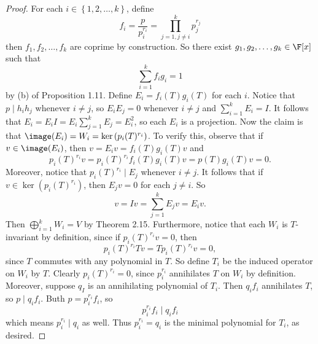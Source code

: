 \documentclass[linearalgebraII]{subfiles}
\begin{document}
    \begin{proof}
        For each $i\in \left\lbrace 1, 2, \ldots, k \right\rbrace$, define
        \begin{equation*}
            f_i = \frac{p}{p_i^{r_i}} = \prod^{k}_{j=1,j\neq i} p_j^{r_j}
        \end{equation*}
        then $f_1, f_2, \ldots, f_k$ are coprime by construction. So there exist $g_1, g_2, \ldots, g_k\in \F[x]$ such that
        \begin{equation*}
            \sum^{k}_{i=1} f_ig_i = 1
        \end{equation*}
        by (b) of Proposition 1.11. Define $E_i = f_i(T)g_i(T)$ for each $i$. Notice that $p\mid h_ih_j$ whenever $i\neq j$, so $E_iE_j = 0$ whenever $i\neq j$ and $\sum^{k}_{i=1} E_i = I$. It follows that $E_i = E_iI = E_i \sum^{k}_{j=1} E_j = E_i^2$, so each $E_i$ is a projection. Now the claim is that $\image(E_i) = W_i = \ker\left( p_i(T)^{r_i} \right)$. To verify this, observe that if $v\in \image(E_i)$, then $v = E_iv = f_i(T)g_i(T)v$ and
        \begin{equation*}
            p_i(T)^{r_i}v = p_i(T)^{r_i}f_i(T)g_i(T)v = p(T)g_i(T)v = 0.
        \end{equation*}
        Moreover, notice that $p_i(T)^{r_i}\mid E_j$ whenever $i\neq j$. It follows that if $v\in \ker\left( p_i(T)^{r_i} \right)$, then $E_jv = 0$ for each $j\neq i$. So
        \begin{equation*}
            v = Iv = \sum^{k}_{j=1} E_jv = E_iv.
        \end{equation*}
        Then $\bigoplus^{k}_{i=1} W_i = V$ by Theorem 2.15. Furthermore, notice that each $W_i$ is $T$-invariant by definition, since if $p_i(T)^{r_i}v = 0$, then
        \begin{equation*}
            p_i(T)^{r_i}Tv = Tp_i(T)^{r_i}v = 0,
        \end{equation*}
        since $T$ commutes with any polynomial in $T$. So define $T_i$ be the induced operator on $W_i$ by $T$. Clearly $p_i(T)^{r_i} = 0$, since $p_i^{r_i}$ annihilates $T$ on $W_i$ by definition. Moreover, suppose $q_I$ is an annihilating polynomial of $T_i$. Then $q_if_i$ annihilates $T$, so $p\mid q_if_i$. Buth $p = p_i^{r_i}f_i$, so
        \begin{equation*}
            p_i^{r_i}f_i\mid q_if_i
        \end{equation*}
        which means $p_i^{r_i}\mid q_i$ as well. Thus $p_i^{r_i} = q_i$ is the minimal polynomial for $T_i$, as desired.
    \end{proof}
\end{document}
